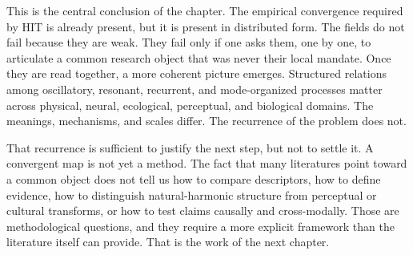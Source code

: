 This is the central conclusion of the chapter. The empirical convergence required by HIT is already present, but it is present in distributed form. The fields do not fail because they are weak. They fail only if one asks them, one by one, to articulate a common research object that was never their local mandate. Once they are read together, a more coherent picture emerges. Structured relations among oscillatory, resonant, recurrent, and mode-organized processes matter across physical, neural, ecological, perceptual, and biological domains. The meanings, mechanisms, and scales differ. The recurrence of the problem does not.

That recurrence is sufficient to justify the next step, but not to settle it. A convergent map is not yet a method. The fact that many literatures point toward a common object does not tell us how to compare descriptors, how to define evidence, how to distinguish natural-harmonic structure from perceptual or cultural transforms, or how to test claims causally and cross-modally. Those are methodological questions, and they require a more explicit framework than the literature itself can provide. That is the work of the next chapter.
